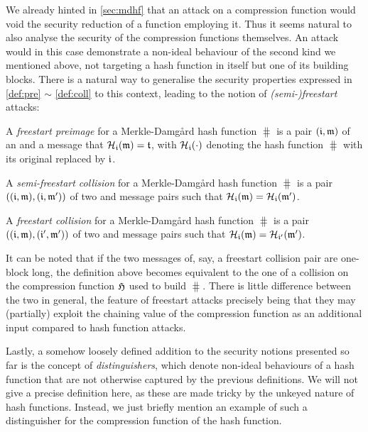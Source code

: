 \bigskip

We already hinted in \autoref{sec:mdhf} that an attack on a compression function would void the security reduction of a \merkdam function employing it. Thus it seems natural to also
analyse the security of the compression functions themselves. An attack would in this case demonstrate a non-ideal behaviour of the second kind we mentioned above, not targeting
a hash function in itself but one of its building blocks. There is a natural way to generalise the security properties expressed in \autoref{def:pre} $\sim$ \autoref{def:coll} to this context,
leading to the notion of \emph{(semi-)freestart} attacks:

\begin{defi}
A \emph{freestart preimage} for a Merkle-Damg\aa rd hash function $\hash$ is a pair $(\mathfrak{i},\mathfrak{m})$
of an \iv and a message that $\operatorname{\mathcal{H}}_{\mathfrak{i}}(\mathfrak{m}) = \mathfrak{t}$, with $\operatorname{\mathcal{H}}_{\mathfrak{i}}(\cdot)$ denoting
the hash function $\hash$ with its original \iv replaced by $\mathfrak{i}$.
\label{def:free_pre}
\end{defi}

\begin{defi}
A \emph{semi-freestart collision} for a Merkle-Damg\aa rd hash function $\hash$ is a pair $((\mathfrak{i},\mathfrak{m}), (\mathfrak{i},\mathfrak{m}'))$
of two \iv and message pairs such that $\operatorname{\mathcal{H}}_{\mathfrak{i}}(\mathfrak{m}) = \operatorname{\mathcal{H}}_{\mathfrak{i}}(\mathfrak{m}')$.
\label{def:semi-free_coll}
\end{defi}

\begin{defi}
A \emph{freestart collision} for a Merkle-Damg\aa rd hash function $\hash$ is a pair $((\mathfrak{i},\mathfrak{m}), (\mathfrak{i}',\mathfrak{m}'))$
of two \iv and message pairs such that $\operatorname{\mathcal{H}}_{\mathfrak{i}}(\mathfrak{m}) = \operatorname{\mathcal{H}}_{\mathfrak{i}'}(\mathfrak{m}')$.
\label{def:free_coll}
\end{defi}

It can be noted that if the two messages of, say, a freestart collision pair are one-block long, the definition above becomes equivalent to the one of a collision
on the compression function $\operatorname{\mathfrak{H}}$ used to build $\hash$.
There is little difference between the two in general, the feature of freestart attacks precisely being that they may (partially) exploit the chaining value
of the compression function as an additional input compared to hash function attacks.


\bigskip

Lastly, a somehow loosely defined addition to the security notions presented so far is the concept of \emph{distinguishers}, which denote non-ideal behaviours
of a hash function that are not otherwise captured by the previous definitions. We will not give a precise definition here, as these are made tricky by
the unkeyed nature of hash functions. Instead, we just briefly mention an example of such a distinguisher for the compression function of the \shaone hash function.

